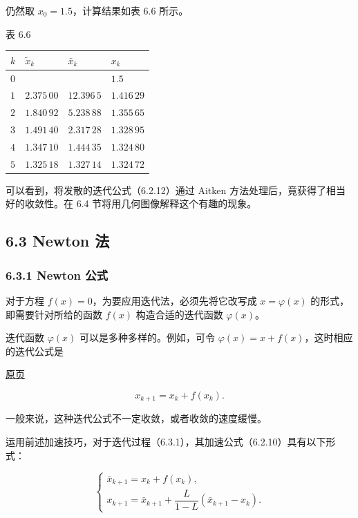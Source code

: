 \documentclass[
  10pt,
  fontset=fandol]{ctexart}
\newcounter{none} %
\begin{document}
仍然取 \(x_0=1.5\)，计算结果如表 6.6 所示。

表 6.6

{\def\LTcaptype{none} %
\begin{longtable}[]{@{}llll@{}}
\toprule\noalign{}
\(k\) & \(\tilde{x}_k\) & \(\bar{x}_k\) & \(x_k\) \\
\midrule\noalign{}
\endhead
\bottomrule\noalign{}
\endlastfoot
\(0\) & & & \(1.5\) \\
\(1\) & \(2.375\,00\) & \(12.396\,5\) & \(1.416\,29\) \\
\(2\) & \(1.840\,92\) & \(5.238\,88\) & \(1.355\,65\) \\
\(3\) & \(1.491\,40\) & \(2.317\,28\) & \(1.328\,95\) \\
\(4\) & \(1.347\,10\) & \(1.444\,35\) & \(1.324\,80\) \\
\(5\) & \(1.325\,18\) & \(1.327\,14\) & \(1.324\,72\) \\
\end{longtable}
}

可以看到，将发散的迭代公式（6.2.12）通过 Aitken 方法处理后，竟获得了相当好的收敛性。在 6.4 节将用几何图像解释这个有趣的现象。

\subsection{6.3 Newton 法}\label{newton-ux6cd5}

\subsubsection{6.3.1 Newton 公式}\label{newton-ux516cux5f0f}

对于方程 \(f(x)=0\)，为要应用迭代法，必须先将它改写成 \(x=\varphi(x)\) 的形式，即需要针对所给的函数 \(f(x)\) 构造合适的迭代函数 \(\varphi(x)\)。

迭代函数 \(\varphi(x)\) 可以是多种多样的。例如，可令 \(\varphi(x)=x+f(x)\)，这时相应的迭代公式是

\href{../../source-images/pdf-163.jpeg}{原页}

\[
x_{k+1}=x_k+f(x_k).
\tag{6.3.1}
\]

一般来说，这种迭代公式不一定收敛，或者收敛的速度缓慢。

运用前述加速技巧，对于迭代过程（6.3.1），其加速公式（6.2.10）具有以下形式：

\[
\begin{cases}
\bar{x}_{k+1}=x_k+f(x_k),\\
x_{k+1}=\bar{x}_{k+1}+\dfrac{L}{1-L}(\bar{x}_{k+1}-x_k).
\end{cases}
\]
\end{document}
